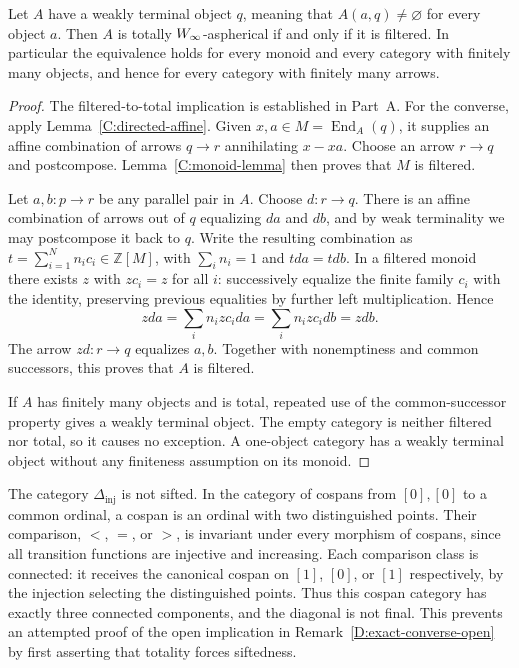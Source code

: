 \begin{theorem}\label{C:weak-terminal}
Let $A$ have a weakly terminal object $q$, meaning that $A(a,q)\ne\varnothing$ for every object $a$. Then $A$ is totally $W_{\infty}$-aspherical if and only if it is filtered. In particular the equivalence holds for every monoid and every category with finitely many objects, and hence for every category with finitely many arrows.
\end{theorem}
\begin{proof}
The filtered-to-total implication is established in Part~A. For the converse, apply Lemma~\ref{C:directed-affine}. Given $x,a\in M=\operatorname{End}_A(q)$, it supplies an affine combination of arrows $q\to r$ annihilating $x-xa$. Choose an arrow $r\to q$ and postcompose. Lemma~\ref{C:monoid-lemma} then proves that $M$ is filtered.

Let $a,b:p\to r$ be any parallel pair in $A$. Choose $d:r\to q$. There is an affine combination of arrows out of $q$ equalizing $da$ and $db$, and by weak terminality we may postcompose it back to $q$. Write the resulting combination as $t=\sum_{i=1}^N n_ic_i\in\mathbb Z[M]$, with $\sum_i n_i=1$ and $tda=tdb$. In a filtered monoid there exists $z$ with $zc_i=z$ for all $i$: successively equalize the finite family $c_i$ with the identity, preserving previous equalities by further left multiplication. Hence
\[
 zda=\sum_i n_izc_ida=\sum_i n_izc_idb=zdb.
\]
The arrow $zd:r\to q$ equalizes $a,b$. Together with nonemptiness and common successors, this proves that $A$ is filtered.

If $A$ has finitely many objects and is total, repeated use of the common-successor property gives a weakly terminal object. The empty category is neither filtered nor total, so it causes no exception. A one-object category has a weakly terminal object without any finiteness assumption on its monoid.
\end{proof}



\begin{example}\label{C:not-sifted}
The category $\Delta_{\mathrm{inj}}$ is not sifted. In the category of cospans from $[0],[0]$ to a common ordinal, a cospan is an ordinal with two distinguished points. Their comparison, $<$, $=$, or $>$, is invariant under every morphism of cospans, since all transition functions are injective and increasing. Each comparison class is connected: it receives the canonical cospan on $[1]$, $[0]$, or $[1]$ respectively, by the injection selecting the distinguished points. Thus this cospan category has exactly three connected components, and the diagonal is not final. This prevents an attempted proof of the open implication in Remark~\ref{D:exact-converse-open} by first asserting that totality forces siftedness.
\end{example}
